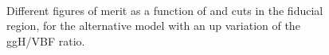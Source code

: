 \begin{figure}[htb]
\centering
{}
\\
\caption{Different figures of merit as a function of \MET and \mt cuts in the fiducial region, for the alternative model with an up variation of the ggH/VBF ratio.}\label{fig:fig_merit_up}
\end{figure}

